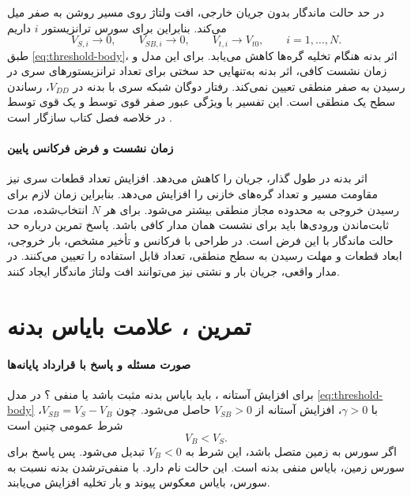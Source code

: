 در حد حالت ماندگار بدون جریان خارجی، افت ولتاژ روی مسیر روشن به
صفر میل می‌کند. بنابراین برای سورس ترانزیستور \(i\) داریم
\begin{equation}
 V_{S,i}\longrightarrow0,\qquad
 V_{SB,i}\longrightarrow0,\qquad
 V_{t,i}\longrightarrow V_{t0},\qquad i=1,\ldots,N.
 \label{eq:body-finite-stack-limit}
\end{equation}
طبق \eqref{eq:threshold-body}، اثر بدنه هنگام تخلیه گره‌ها کاهش می‌یابد.
برای این مدل و زمان نشست کافی، اثر بدنه به‌تنهایی حد سختی برای تعداد
ترانزیستورهای سری در رسیدن به صفر منطقی تعیین نمی‌کند.
رفتار دوگان شبکه سری  با بدنه در \(V_{DD}\)، رساندن سطح
یک منطقی است. این تفسیر با ویژگی عبور صفر قوی توسط  و یک
قوی توسط  در خلاصه فصل کتاب سازگار است
\cite[صفحه ۹۵]{weste}.

\paragraph*{زمان نشست و فرض فرکانس پایین}
اثر بدنه در طول گذار، جریان را کاهش می‌دهد. افزایش تعداد قطعات سری
نیز مقاومت مسیر و تعداد گره‌های خازنی را افزایش می‌دهد. بنابراین زمان
لازم برای رسیدن خروجی به محدوده مجاز منطقی بیشتر می‌شود.
برای هر \(N\) انتخاب‌شده، مدت ثابت‌ماندن ورودی‌ها باید برای نشست
همان مدار کافی باشد. پاسخ تمرین درباره حد حالت ماندگار با این فرض
است. در طراحی با فرکانس و تأخیر مشخص، بار خروجی، ابعاد قطعات و
مهلت رسیدن به سطح منطقی، تعداد قابل استفاده را تعیین می‌کنند.
در مدار واقعی، جریان بار و نشتی نیز می‌توانند افت ولتاژ ماندگار ایجاد کنند.

\section*{تمرین ، علامت بایاس بدنه}
\paragraph*{صورت مسئله و پاسخ با قرارداد پایانه‌ها}
برای افزایش آستانه ، باید بایاس بدنه مثبت باشد یا منفی
\cite[تمرین ، صفحه ۹۶]{weste}؟
در مدل \eqref{eq:threshold-body} با \(\gamma>0\)، افزایش آستانه
از \(V_{SB}>0\) حاصل می‌شود. چون \(V_{SB}=V_S-V_B\)، شرط عمومی چنین است
\begin{equation}
 \boxed{V_B<V_S}.
 \label{eq:body-bias-general-sign}
\end{equation}
اگر سورس به زمین متصل باشد، این شرط به \(V_B<0\) تبدیل می‌شود.
پس پاسخ برای سورس زمین، بایاس منفی بدنه است. این حالت
 نام دارد. با منفی‌ترشدن بدنه نسبت به
سورس، بایاس معکوس پیوند و بار تخلیه افزایش می‌یابند.

